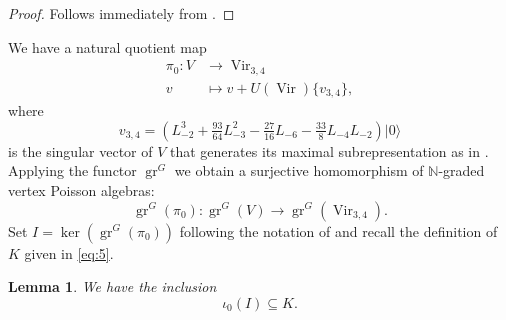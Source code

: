 \documentclass[12pt, a4paper]{article}
\newtheorem{lemma}[theorem]{Lemma}
\theoremstyle{remark}
\DeclareMathOperator{\Vir}{Vir}
\DeclareMathOperator{\gr}{gr}
\newcommand{\vac}{|0\rangle}
\begin{document}
\begin{proof}
  Follows immediately from .
\end{proof}

We have a natural quotient map
\begin{align*}
  \pi_0: V &\to \Vir_{3, 4} \\
 v &\mapsto v + U(\Vir)\{v_{3, 4}\},
\end{align*}
where
\begin{equation*}
  v_{3, 4} = (L_{-2}^3 + \tfrac{93}{64}L_{-3}^2 - \tfrac{27}{16}L_{-6} - \tfrac{33}{8}L_{-4}L_{-2})\vac
\end{equation*}
is the singular vector of $V$ that generates its maximal subrepresentation as in \cite{andrews_singular_2022}.
Applying the functor $\gr^G$ we obtain a surjective homomorphism of $\mathbb{N}$-graded vertex Poisson algebras:
\begin{equation*}
  \gr^G(\pi_0): \gr^G(V) \to \gr^G(\Vir_{3, 4}).
\end{equation*}
Set $I = \ker(\gr^G(\pi_0))$ following the notation of \cite{andrews_singular_2022} and recall the definition of $K$ given in \eqref{eq:5}.

\begin{lemma}
  \label{lmm:10}
  We have the inclusion
  \begin{equation*}
    \iota_0(I) \subseteq K.
  \end{equation*}
\end{lemma}
\end{document}
